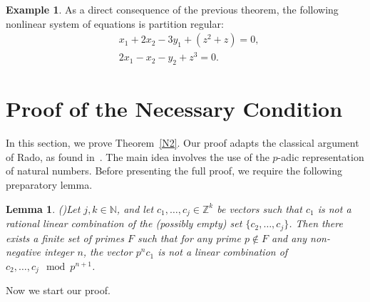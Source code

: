 \documentclass{article}
\theoremstyle{Theorem}
\newtheorem{lem}[thm]{Lemma}
\theoremstyle{definition}
\newtheorem{example}[thm]{Example}
\begin{document}
\begin{example}
As a direct consequence of the previous theorem, the following nonlinear system of equations is partition regular:
\[
\begin{aligned}
&x_1 + 2x_2 - 3y_1 + (z^2 + z) = 0, \\
&2x_1 - x_2 - y_2 + z^3 = 0.
\end{aligned}
\]
\end{example}




\section{Proof of the Necessary Condition}

In this section, we prove Theorem~\ref{N2}. Our proof adapts the classical argument of Rado, as found in~\cite{Graham, Moreira}. The main idea involves the use of the $p$-adic representation of natural numbers. Before presenting the full proof, we require the following preparatory lemma.


\begin{lem}\textup{(\cite[Chapter 3, Lemma 6, Page: 74]{Graham})}\label{N1}
  Let \( j, k \in \mathbb{N} \), and let \( c_1, \dots, c_j \in \mathbb{Z}^k \) be vectors such that \( c_1 \) is not a rational linear combination of the (possibly empty) set \( \{c_2, \dots, c_j\} \). Then there exists a finite set of primes \( F \) such that for any prime \( p \notin F \) and any non-negative integer \( n \), the vector \( p^n c_1 \) is not a linear combination of \( c_2, \dots, c_j \mod p^{n+1} \).


\end{lem}

Now we start our proof.
\end{document}
